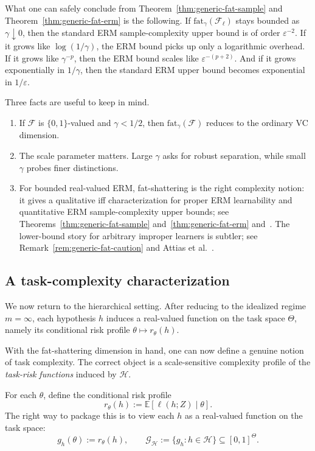 \documentclass[11pt]{article}
\theoremstyle{definition}
\newcommand{\E}{\mathbb{E}}
\begin{document}
What one can safely conclude from Theorem~\ref{thm:generic-fat-sample} and Theorem~\ref{thm:generic-fat-erm} is the following. If $\mathrm{fat}_{\gamma}(\mathcal{F}_{\ell})$ stays bounded as $\gamma \downarrow 0$, then the standard ERM sample-complexity upper bound is of order $\varepsilon^{-2}$. If it grows like $\log(1/\gamma)$, the ERM bound picks up only a logarithmic overhead. If it grows like $\gamma^{-p}$, then the ERM bound scales like $\varepsilon^{-(p+2)}$. And if it grows exponentially in $1/\gamma$, then the standard ERM upper bound becomes exponential in $1/\varepsilon$.

Three facts are useful to keep in mind.
\begin{enumerate}[label=(\roman*)]
\item If $\mathcal{F}$ is $\{0,1\}$-valued and $\gamma < 1/2$, then $\mathrm{fat}_{\gamma}(\mathcal{F})$ reduces to the ordinary VC dimension.
\item The scale parameter matters. Large $\gamma$ asks for robust separation, while small $\gamma$ probes finer distinctions.
\item For bounded real-valued ERM, fat-shattering is the right complexity notion: it gives a qualitative iff characterization for proper ERM learnability and quantitative ERM sample-complexity upper bounds; see Theorems~\ref{thm:generic-fat-sample} and~\ref{thm:generic-fat-erm} and~\cite{bartlett1996,bartlettlong1998,colomboni2023}. The lower-bound story for arbitrary improper learners is subtler; see Remark~\ref{rem:generic-fat-caution} and Attias et al.~\cite{attias2024}.
\end{enumerate}

\subsection{A task-complexity characterization}
We now return to the hierarchical setting. After reducing to the idealized regime $m=\infty$, each hypothesis $h$ induces a real-valued function on the task space $\Theta$, namely its conditional risk profile $\theta \mapsto r_{\theta}(h)$.

With the fat-shattering dimension in hand, one can now define a genuine notion of task complexity. The correct object is a scale-sensitive complexity profile of the \emph{task-risk functions} induced by $\mathcal{H}$.

For each $\theta$, define the conditional risk profile
\[
r_{\theta}(h) := \E[\ell(h;Z)\mid \theta].
\]
The right way to package this is to view each $h$ as a real-valued function on the task space:
\[
g_h(\theta) := r_{\theta}(h),
\qquad
\mathcal{G}_{\mathcal{H}} := \{g_h : h \in \mathcal{H}\} \subseteq [0,1]^{\Theta}.
\]
\end{document}
